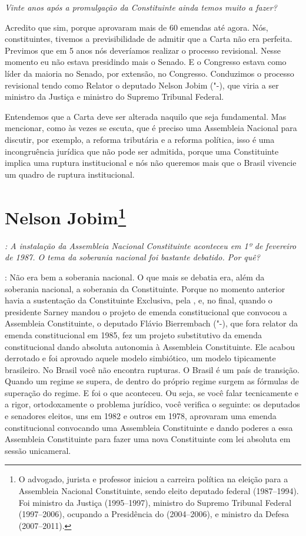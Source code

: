 \medskip

\noindent\emph{Vinte anos após a promulgação da Constituinte ainda temos muito
a fazer?}

Acredito que sim, porque aprovaram mais de 60
emendas até agora. Nós, constituintes, tivemos a previsibilidade de
admitir que a Carta não era perfeita. Previmos que em 5 anos nós
deveríamos realizar o processo revisional. Nesse momento eu não estava
presidindo mais o Senado. E o Congresso estava como líder da maioria no
Senado, por extensão, no Congresso. Conduzimos o processo revisional
tendo como Relator o deputado Nelson Jobim ("-), que viria a ser
ministro da Justiça e ministro do Supremo Tribunal Federal.

Entendemos que a Carta deve ser alterada naquilo que seja fundamental.
Mas mencionar, como às vezes se escuta, que é preciso uma Assembleia
Nacional para discutir, por exemplo, a reforma tributária e a reforma
política, isso é uma incongruência jurídica que não pode ser admitida,
porque uma Constituinte implica uma ruptura institucional e nós não
queremos mais que o Brasil vivencie um quadro de ruptura institucional.

\chapter{Nelson Jobim\footnote{O advogado, jurista e professor iniciou a carreira política na eleição
para a Assembleia Nacional Constituinte, sendo eleito deputado federal
(1987--1994). Foi ministro da Justiça (1995--1997), ministro do Supremo
Tribunal Federal (1997--2006), ocupando a Presidência do  (2004--2006),
e ministro da Defesa (2007--2011).}}

\emph{: A instalação da Assembleia Nacional Constituinte aconteceu em 1º
de fevereiro de 1987. O tema da soberania nacional foi bastante
debatido. Por quê?}

: Não era bem a soberania nacional. O que mais se debatia
era, além da soberania nacional, a soberania da Constituinte. Porque no
momento anterior havia a sustentação da Constituinte Exclusiva, pela
, e, no final, quando o presidente Sarney mandou o projeto de emenda
constitucional que convocou a Assembleia Constituinte, o deputado Flávio
Bierrembach ("-), que fora relator da emenda constitucional em 1985,
fez um projeto substitutivo da emenda constitucional dando absoluta
autonomia à Assembleia Constituinte. Ele acabou derrotado e foi aprovado
aquele modelo simbiótico, um modelo tipicamente brasileiro. No Brasil
você não encontra rupturas. O Brasil é um país de transição. Quando um
regime se supera, de dentro do próprio regime surgem as fórmulas de
superação do regime. E foi o que aconteceu. Ou seja, se você falar
tecnicamente e a rigor, ortodoxamente o problema jurídico, você verifica
o seguinte: os deputados e senadores eleitos, uns em 1982 e outros em
1978, aprovaram uma emenda constitucional convocando uma Assembleia
Constituinte e dando poderes a essa Assembleia Constituinte para fazer
uma nova Constituinte com lei absoluta em sessão unicameral.

